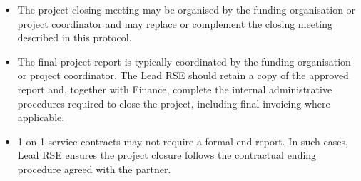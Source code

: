 \vspace{-0.2cm}
\begin{itemize}
  \item The project closing meeting may be organised by the funding organisation or project coordinator and may replace 
  or complement the closing meeting described in this protocol.
  \item The final project report is typically coordinated by the funding organisation or project coordinator. The Lead 
  RSE should retain a copy of the approved report and, together with Finance, complete the internal administrative 
  procedures required to close the project, including final invoicing where applicable.
  \item 1-on-1 service contracts may not require a formal end report. In such cases, Lead RSE ensures the project 
  closure follows the contractual ending procedure agreed with the partner. 
\end{itemize}
\vspace{-0.2cm}